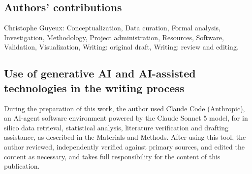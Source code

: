 \documentclass[11pt,a4paper]{article}
\begin{document}
\subsection*{Authors' contributions}

Christophe Guyeux: Conceptualization, Data curation, Formal analysis, Investigation, Methodology, Project administration, Resources, Software, Validation, Visualization, Writing: original draft, Writing: review and editing.

\subsection*{Use of generative AI and AI-assisted technologies in the writing process}

During the preparation of this work, the author used Claude Code (Anthropic), an AI-agent software environment powered by the Claude Sonnet 5 model, for in silico data retrieval, statistical analysis, literature verification and drafting assistance, as described in the Materials and Methods. After using this tool, the author reviewed, independently verified against primary sources, and edited the content as necessary, and takes full responsibility for the content of this publication.



\end{document}
